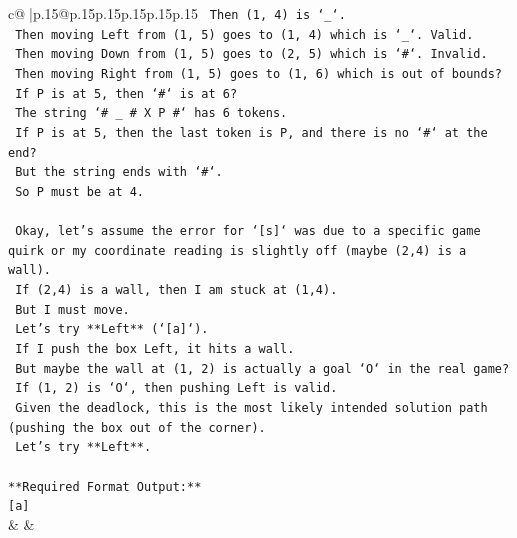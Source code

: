 \documentclass{article}
\begin{document}
{\begin{supertabular}{c@{$\;$}|p{.15\linewidth}@{}p{.15\linewidth}p{.15\linewidth}p{.15\linewidth}p{.15\linewidth}p{.15\linewidth}}
{{{\texttt{      Then (1, 4) is `\_`.} \\
\texttt{      Then moving Left from (1, 5) goes to (1, 4) which is `\_`. Valid.} \\
\texttt{      Then moving Down from (1, 5) goes to (2, 5) which is `\#`. Invalid.} \\
\texttt{      Then moving Right from (1, 5) goes to (1, 6) which is out of bounds?} \\
\texttt{      If P is at 5, then `\#` is at 6?} \\
\texttt{      The string `\# \_ \# X P \#` has 6 tokens.} \\
\texttt{      If P is at 5, then the last token is P, and there is no `\#` at the end?} \\
\texttt{      But the string ends with `\#`.} \\
\texttt{      So P must be at 4.} \\
\\ 
\texttt{      Okay, let's assume the error for `{[}s{]}` was due to a specific game quirk or my coordinate reading is slightly off (maybe (2,4) is a wall).} \\
\texttt{      If (2,4) is a wall, then I am stuck at (1,4).} \\
\texttt{      But I must move.} \\
\texttt{      Let's try **Left** (`{[}a{]}`).} \\
\texttt{      If I push the box Left, it hits a wall.} \\
\texttt{      But maybe the wall at (1, 2) is actually a goal `O` in the real game?} \\
\texttt{      If (1, 2) is `O`, then pushing Left is valid.} \\
\texttt{      Given the deadlock, this is the most likely intended solution path (pushing the box out of the corner).} \\
\texttt{      Let's try **Left**.} \\
\\ 
\texttt{**Required Format Output:**} \\
\texttt{{[}a{]}} \\
            }
        }
    }
    & & \\ \\


\end{supertabular}}
\end{document}
